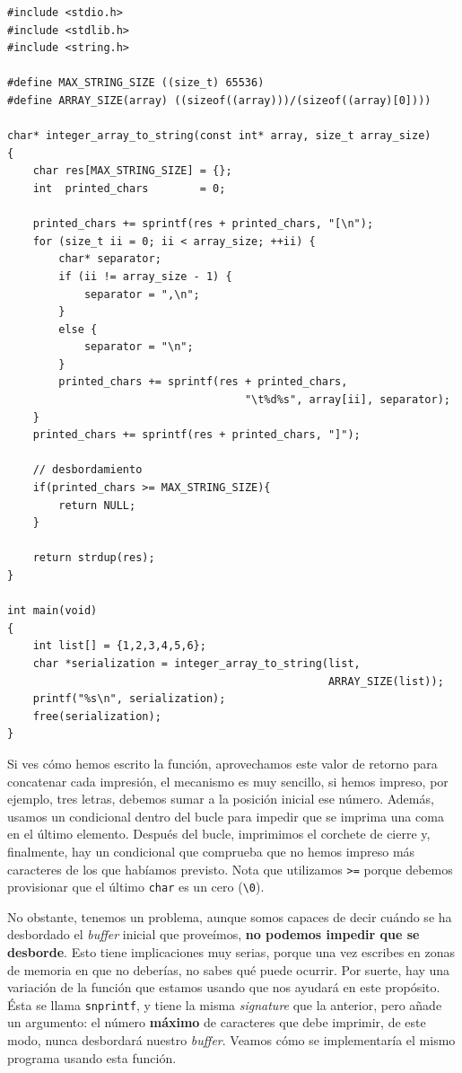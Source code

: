 \documentclass[a4paper]{article}
\begin{document}
\noindent
\begin{minipage}[H]{\linewidth}
\mbox{}
\begin{lstlisting}[style=C,
caption={Ejemplo de uso avanzado de \texttt{sprintf}},
label={lst:sprintfExample}]
#include <stdio.h>
#include <stdlib.h>
#include <string.h>

#define MAX_STRING_SIZE ((size_t) 65536)
#define ARRAY_SIZE(array) ((sizeof((array)))/(sizeof((array)[0])))

char* integer_array_to_string(const int* array, size_t array_size)
{
    char res[MAX_STRING_SIZE] = {};
    int  printed_chars        = 0;

    printed_chars += sprintf(res + printed_chars, "[\n");
    for (size_t ii = 0; ii < array_size; ++ii) {
        char* separator;
        if (ii != array_size - 1) {
            separator = ",\n";
        }
        else {
            separator = "\n";
        }
        printed_chars += sprintf(res + printed_chars,
                                     "\t%d%s", array[ii], separator);
    }
    printed_chars += sprintf(res + printed_chars, "]");

    // desbordamiento
    if(printed_chars >= MAX_STRING_SIZE){
        return NULL;
    }

    return strdup(res);
}

int main(void)
{
    int list[] = {1,2,3,4,5,6};
    char *serialization = integer_array_to_string(list,
                                                  ARRAY_SIZE(list));
    printf("%s\n", serialization);
    free(serialization);
}
\end{lstlisting}
\end{minipage}

Si ves cómo hemos escrito la función, aprovechamos este valor de retorno para
concatenar cada impresión, el mecanismo es muy sencillo, si hemos impreso,
por ejemplo, tres letras, debemos sumar a la posición inicial ese número.
Además, usamos un condicional dentro del bucle para impedir que se imprima
una coma en el último elemento. Después del bucle, imprimimos el corchete de
cierre y, finalmente, hay un condicional que comprueba que no hemos impreso
más caracteres de los que habíamos previsto. Nota que utilizamos \verb!>=!
porque debemos provisionar que el último \verb!char! es un cero (\verb!\0!).

No obstante, tenemos un problema, aunque somos capaces de decir cuándo se ha
desbordado el \emph{buffer} inicial que proveímos, \textbf{no podemos impedir
que se desborde}. Esto tiene implicaciones muy serias, porque una vez escribes
en zonas de memoria en que no deberías, no sabes qué puede ocurrir. Por suerte,
hay una variación de la función que estamos usando que nos ayudará en este
propósito. Ésta se llama \verb!snprintf!, y tiene la misma \textit{signature}
que la anterior, pero añade un argumento: el número \textbf{máximo} de
caracteres que debe imprimir, de este modo, nunca desbordará nuestro
\emph{buffer}. Veamos cómo se implementaría el mismo programa usando esta
función.
\end{document}
